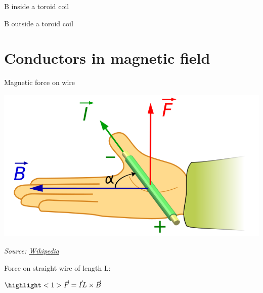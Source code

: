 \documentclass[compress]{beamer}
\newcommand{\source}[2]{{\tiny\it Source: \href{#1}{#2}}}
\begin{document}

{
    \begin{frame}{B inside a toroid coil}
    \end{frame}
}


{
    \begin{frame}{B outside a toroid coil}
    \end{frame}
}


\section[Force]{Conductors in magnetic field}


\begin{frame}{Magnetic force on wire}

    \begin{center}
        \includegraphics[width=0.8\linewidth]{lorentz-force-right-hand-rule}

        \source{https://en.wikipedia.org/wiki/Lorentz_force}{Wikipedia}
    \end{center}

    Force on straight wire of length L:

    \begin{center}
    \Large
        $\highlight<1>{\vec{F} = \vec{I} L \times \vec{B}}$
    \end{center}

\end{frame}

\end{document}
